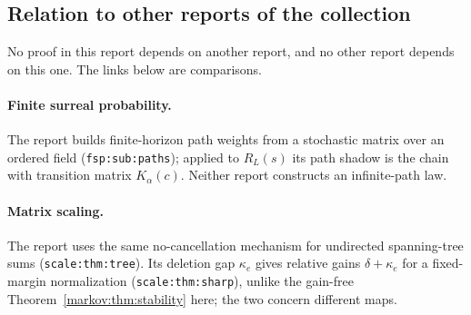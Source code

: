 \documentclass[11pt]{article}
\numberwithin{equation}{section}
\theoremstyle{definition}
\theoremstyle{remark}
\begin{document}
\subsection{Relation to other reports of the collection}\label{markov:sec:neighbours}

No proof in this report depends on another report, and no other report depends
on this one. The links below are comparisons.

\paragraph{Finite surreal probability.}
The report  builds
finite-horizon path weights from a stochastic matrix over an ordered field
(\texttt{fsp:sub:paths}); applied to $R_L(s)$ its path shadow is the chain with
transition matrix $K_\alpha(c)$. Neither report constructs an infinite-path law.

\paragraph{Matrix scaling.}
The report  uses the same
no-cancellation mechanism for undirected spanning-tree sums
(\texttt{scale:thm:tree}). Its deletion gap $\kappa_e$ gives relative gains
$\delta+\kappa_e$ for a fixed-margin normalization (\texttt{scale:thm:sharp}),
unlike the gain-free Theorem~\ref{markov:thm:stability} here; the two concern
different maps.
\end{document}
